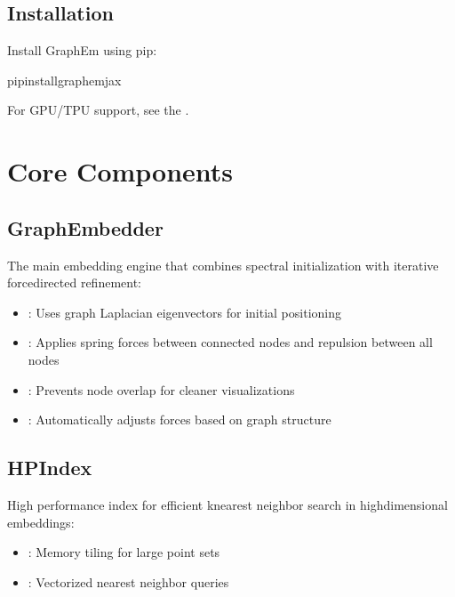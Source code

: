 \documentclass[letterpaper,10pt,english]{sphinxmanual}
\begin{document}
\section{Installation}
\label{\detokenize{index:installation}}
\sphinxAtStartPar
Install GraphEm using pip:

\begin{sphinxVerbatim}[commandchars=\\\{\}]
pipinstallgraphem\PYGZhy{}jax
\end{sphinxVerbatim}

\sphinxAtStartPar
For GPU/TPU support, see the .


\chapter{Core Components}
\label{\detokenize{index:core-components}}

\section{GraphEmbedder}
\label{\detokenize{index:graphembedder}}
\sphinxAtStartPar
The main embedding engine that combines spectral initialization with iterative force\sphinxhyphen{}directed refinement:
\begin{itemize}
\item {} 
\sphinxAtStartPar
{}: Uses graph Laplacian eigenvectors for initial positioning

\item {} 
\sphinxAtStartPar
{}: Applies spring forces between connected nodes and repulsion between all nodes

\item {} 
\sphinxAtStartPar
{}: Prevents node overlap for cleaner visualizations

\item {} 
\sphinxAtStartPar
{}: Automatically adjusts forces based on graph structure

\end{itemize}


\section{HPIndex}
\label{\detokenize{index:hpindex}}
\sphinxAtStartPar
High performance index for efficient k\sphinxhyphen{}nearest neighbor search in high\sphinxhyphen{}dimensional embeddings:
\begin{itemize}
\item {} 
\sphinxAtStartPar
{}: Memory tiling for large point sets

\item {} 
\sphinxAtStartPar
{}: Vectorized nearest neighbor queries

\end{itemize}
\end{document}
